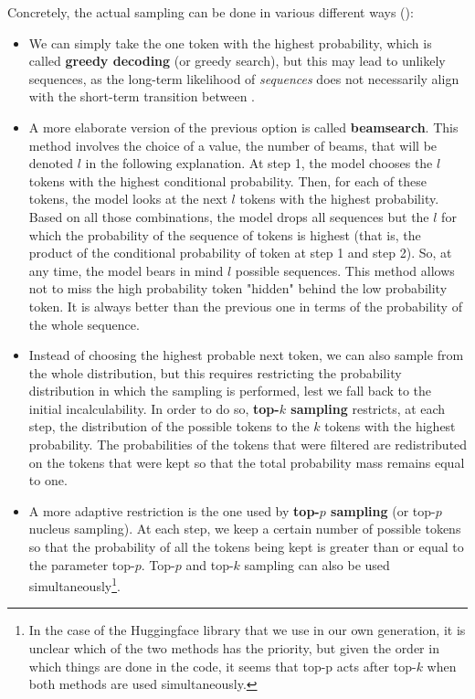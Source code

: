 \documentclass{article}
\begin{document}
\begin{multicols}{2}
Concretely, \hypertarget{options-generation}{the actual sampling can be done in various different ways }(\cite{howtogen}):
\begin{itemize}
    \item We can simply take the one token with the highest probability, which is called \textbf{greedy decoding} (or greedy search), but this may lead to unlikely sequences, as the long-term likelihood of \textit{sequences} does not necessarily align with the short-term transition between .
    \item A more elaborate version of the previous option is called \textbf{beamsearch}. This method involves the choice of a value, the number of beams, that will be denoted $l$ in the following explanation. At step 1, the model chooses the $l$ tokens with the highest conditional probability. Then, for each of these tokens, the model looks at the next $l$ tokens with the highest probability. Based on all those combinations, the model drops all sequences but the $l$ for which the probability of the sequence of tokens is highest (that is, the product of the conditional probability of token at step 1 and step 2). So, at any time, the model bears in mind $l$ possible sequences. This method allows not to miss the high probability token "hidden" behind the low probability token. It is always better than the previous one in terms of the probability of the whole sequence. 
    \item Instead of choosing the highest probable next token, we can also sample from the whole distribution, but this requires restricting the probability distribution in which the sampling is performed, lest we fall back to the initial incalculability. In order to do so, \textbf{top-$k$ sampling} restricts, at each step, the distribution of the possible tokens to the $k$ tokens with the highest probability. The probabilities of the tokens that were filtered are redistributed on the tokens that were kept so that the total probability mass remains equal to one. 
    \item A more adaptive restriction is the one used by \textbf{top-$p$ sampling} (or top-$p$ nucleus sampling). At each step, we keep a certain number of possible tokens so that the probability of all the tokens being kept is greater than or equal to the parameter top-$p$. Top-$p$ and top-$k$ sampling can also be used simultaneously\footnote{In the case of the Huggingface library that we use in our own generation, it is unclear which of the two methods has the priority, but given the order in which things are done in the code, it seems that top-p acts after top-$k$ when both methods are used simultaneously.}.
\end{itemize}



\end{multicols}
\end{document}
